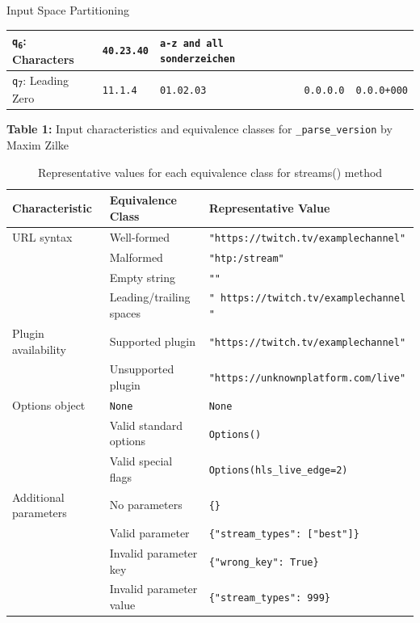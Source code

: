 \documentclass[a4paper]{scrreprt}
\newcounter{question}
\begin{document}
\begin{question}{Input Space Partitioning}
\begin{enumerate}[topsep=0pt, leftmargin=*]
\begin{answer}
\begin{tabular}{|p{2.5cm}|p{2.5cm}|p{2.5cm}|p{2.5cm}|p{2.5cm}|}
\texttt{q\textsubscript{6}}: Characters& \texttt{40.23.40} & \texttt{a-z and all sonderzeichen} & \texttt{} & \texttt{}\\
\hline

\texttt{q\textsubscript{7}}: Leading Zero& \texttt{11.1.4} & \texttt{01.02.03} & \texttt{0.0.0.0} & \texttt{0.0.0+000}\\
\hline
\hline
\end{tabular}
\label{tab:parse-version-eqclasses}
\vspace{0.5em}
\noindent
\textbf{Table 1:} Input characteristics and equivalence classes for \texttt{\_parse\_version} by Maxim Zilke

\begin{table}[H]
\centering
\small
\renewcommand{\arraystretch}{1.2}
\begin{tabular}{|p{3.2cm}|p{3.5cm}|p{6cm}|}
\hline
\textbf{Characteristic} & \textbf{Equivalence Class} & \textbf{Representative Value} \\
\hline
URL syntax & Well-formed & \texttt{"https://twitch.tv/examplechannel"} \\
\cline{2-3}
           & Malformed & \texttt{"htp:/stream"} \\
\cline{2-3}
           & Empty string & \texttt{""} \\
\cline{2-3}
           & Leading/trailing spaces & \texttt{"  https://twitch.tv/examplechannel  "} \\
\hline
Plugin availability & Supported plugin & \texttt{"https://twitch.tv/examplechannel"} \\
\cline{2-3}
                    & Unsupported plugin & \texttt{"https://unknownplatform.com/live"} \\
\hline
Options object & \texttt{None} & \texttt{None} \\
\cline{2-3}
               & Valid standard options & \texttt{Options()} \\
\cline{2-3}
               & Valid special flags & \texttt{Options(hls\_live\_edge=2)} \\
\hline
Additional parameters & No parameters & \texttt{\{\}} \\
\cline{2-3}
                     & Valid parameter & \texttt{\{"stream\_types": ["best"]\}} \\
\cline{2-3}
                     & Invalid parameter key & \texttt{\{"wrong\_key": True\}} \\
\cline{2-3}
                     & Invalid parameter value & \texttt{\{"stream\_types": 999\}} \\
\hline
\end{tabular}
\caption{Representative values for each equivalence class for streams() method}
\end{table}


\end{answer}
\end{enumerate}
\end{question}
\end{document}
